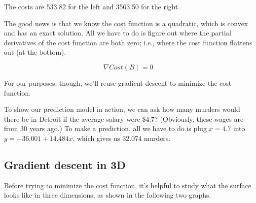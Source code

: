 \begin{fullwidth}
\noindent The costs are 533.82 for the left and 3563.50 for the right.

The good news is that we know the cost function is a quadratic, which is convex and has an exact solution. All we have to do is figure out where the partial derivatives of the cost function are both zero; i.e., where the cost function flattens out (at the bottom).

\[\tag{Analytic solution to convex optimization}
\nabla Cost(B) = 0
\]

\noindent For our purposes, though, we'll reuse gradient descent to minimize the cost function.

To show our prediction model in action, we can ask how many murders would there be in Detroit if the average salary were \$4.7? (Obviously, these wages are from 30 years ago.) To make a prediction, all we have to do is plug $x=4.7$ into $y = -36.001 + 14.484 x$, which gives us 32.074 murders.

\subsection{Gradient descent in 3D}

Before trying to minimize the cost function, it's helpful to study what the surface looks like in three dimensions, as shown in the following two graphs.


\end{fullwidth}
